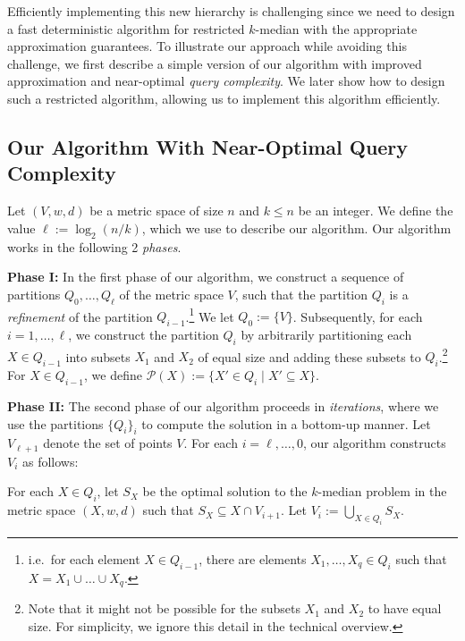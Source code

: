 \documentclass[11pt]{article}
\newenvironment{wrapper}[1]
{
\begin{center}
		\begin{minipage}{\linewidth}
			\begin{mdframed}[hidealllines=true, backgroundcolor=gray!20, leftmargin=0cm,innerleftmargin=0.4cm,innerrightmargin=0.4cm,innertopmargin=0.4cm,innerbottommargin=0.4cm,roundcorner=0pt]
				#1}
			{\end{mdframed}
		\end{minipage}
	\end{center}
}
\newcommand{\1}{\mathmybb{1}}
\begin{document}
Efficiently implementing this new hierarchy is challenging since we need to design a fast deterministic algorithm for restricted $k$-median with the appropriate approximation guarantees.
To illustrate our approach while avoiding this challenge, we first describe a simple version of our algorithm with improved approximation and near-optimal \emph{query complexity}. We later show how to design such a restricted algorithm, allowing us to implement this algorithm efficiently.


\subsection{Our Algorithm With Near-Optimal Query Complexity}\label{sec:low query}


Let $(V, w, d)$ be a metric space of size $n$ and $k \leq n$ be an integer.
We define the value $\ell := \log_2(n/k)$, which we use to describe our algorithm.
Our algorithm works in the following 2 \emph{phases}.

\medskip
\noindent
\textbf{Phase I:} In the first phase of our algorithm, we construct a sequence of partitions $Q_0,\dots, Q_\ell$ of the metric space $V$, such that the partition $Q_i$ is a \emph{refinement} of the partition $Q_{i-1}$.\footnote{i.e.~for each element $X \in Q_{i-1}$, there are elements $X_1,\dots, X_q \in Q_i$ such that $X=X_1\cup \dots \cup X_q$.} We let $Q_0 := \{V\}$. Subsequently, for each $i = 1,\dots,\ell$, we construct the partition $Q_i$ by arbitrarily partitioning each $X \in Q_{i-1}$ into subsets $X_1$ and $X_{2}$ of equal size and adding these subsets to $Q_i$.\footnote{Note that it might not be possible for the subsets $X_1$ and $X_{2}$ to have equal size.
For simplicity, we ignore this detail in the technical overview.}
For $X \in Q_{i-1}$, we define $\mathcal P(X) := \{X' \in Q_{i} \mid X' \subseteq X\}$.

\medskip
\noindent
\textbf{Phase II:}
The second phase of our algorithm proceeds in \emph{iterations}, where we use the partitions $\{Q_i\}_i$ to compute the solution in a bottom-up manner.
Let $V_{\ell + 1}$ denote the set of points $V$.
For each $i = \ell ,\dots, 0$, our algorithm constructs $V_i$ as follows:

\begin{wrapper}
    For each $X \in Q_i$, let $S_X$ be the optimal solution to the $k$-median problem in the metric space $(X,w,d)$ such that $S_X \subseteq X \cap V_{i+1}$. Let $V_i := \bigcup_{X \in Q_i} S_X$.
\end{wrapper}
\end{document}
